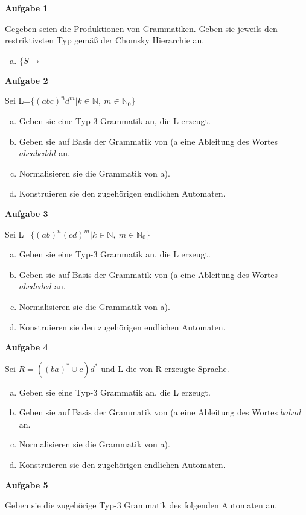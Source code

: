 \documentclass[a4paper,12pt]{article}
\newcommand{\Aufgabe}[1]{
  {
  \vspace*{0.5cm}
  \textsf{\textbf{Aufgabe #1}}
  \vspace*{0.2cm}
  
  }
}
\begin{document}
\Aufgabe{1}
Gegeben seien die Produktionen von Grammatiken. Geben sie jeweils den restriktivsten Typ  gemäß der Chomsky Hierarchie an.
\begin{enumerate}[a)]
\item $ \{ S \rightarrow  $
\end{enumerate}

\Aufgabe{2}
Sei L=$\{(abc)^n d^m \vert k \in \mathbb{N}, \ m\in \mathbb{N}_0 \}$
\begin{enumerate}[a)]
\item Geben sie eine Typ-3 Grammatik an, die L erzeugt.
\item Geben sie auf Basis der Grammatik von (a eine Ableitung des Wortes $abcabcddd$ an.
\item Normalisieren sie die Grammatik von a).
\item Konstruieren sie den zugehörigen endlichen Automaten.
\end{enumerate}

\Aufgabe{3}
Sei L=$\{(ab)^n(cd)^m \vert k \in \mathbb{N}, \ m\in \mathbb{N}_0 \}$
\begin{enumerate}[a)]
\item Geben sie eine Typ-3 Grammatik an, die L erzeugt.
\item Geben sie auf Basis der Grammatik von (a eine Ableitung des Wortes $abcdcdcd$ an.
\item Normalisieren sie die Grammatik von a).
\item Konstruieren sie den zugehörigen endlichen Automaten.
\end{enumerate}

\Aufgabe{4}
Sei $R = ((ba)^* \cup c ) d^* $
und L die von R erzeugte Sprache.
\begin{enumerate}[a)]
\item Geben sie eine Typ-3 Grammatik an, die L erzeugt.
\item Geben sie auf Basis der Grammatik von (a eine Ableitung des Wortes $babad$ an.
\item Normalisieren sie die Grammatik von a).
\item Konstruieren sie den zugehörigen endlichen Automaten.
\end{enumerate}


\Aufgabe{5}
Geben sie die zugehörige Typ-3 Grammatik des folgenden Automaten an.


\end{document}
